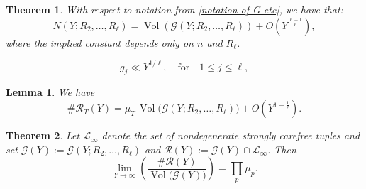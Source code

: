 \documentclass[10pt,a4paper]{amsart}
\newtheorem{theorem}{Theorem}
\newtheorem{lemma}{Lemma}
\begin{document}
\begin{theorem}\label{thm:lattice-count}
With respect to notation from \eqref{notation of G etc}, we have that:
\[
N(Y;R_2,\dots,R_\ell)
=
\operatorname{Vol}\!\left(
\mathcal G(Y;R_2,\dots,R_\ell)
\right)
+
O\!\left(
Y^{\frac{\ell-1}{\ell}}
\right),
\]
where the implied constant depends only on $n$ and $R_\ell$.
\end{theorem}

\begin{equation}\label{g_i bound}
g_j
\ll
Y^{1/\ell},
\quad \text{for}\quad
1\le j\le\ell,
\end{equation}

\begin{lemma}\label{lem:finite-sieve-general}
We have
\[
\#\mathcal R_T(Y)
=
\mu_T\,
\operatorname{Vol}\!\bigl(
\mathcal G(Y;R_2,\dots,R_\ell)
\bigr)
+
O\!\left(
Y^{1-\frac{1}{\ell}}
\right).
\]
\end{lemma}

\begin{theorem}\label{thm:infinite-sieve-general}
Let $\mathcal L_\infty$
denote the set of nondegenerate strongly carefree tuples and set $\mathcal G(Y):=\mathcal G(Y; R_2, \dots, R_\ell)$ and $\mathcal{R}(Y):=\mathcal G(Y)\cap\mathcal L_\infty$. Then
\[
\lim_{Y\rightarrow \infty}\left(\frac{\#\mathcal{R}(Y)}{\operatorname{Vol}\!\bigl(\mathcal G(Y)\bigr)}\right)
=\prod_p \mu_p.\]
\end{theorem}
\end{document}
